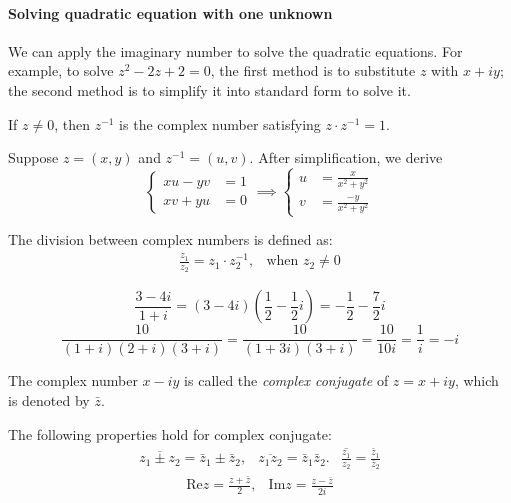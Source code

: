 \paragraph{Solving quadratic equation with one unknown}We can apply the imaginary number to solve the quadratic equations. For example, to solve $z^2-2z+2=0$, the first method is to substitute $z$ with $x+iy$; the second method is to simplify it into standard form to solve it.
\begin{definition} 
If $z\ne0$, then $z^{-1}$ is the complex number satisfying $z\cdot z^{-1}=1$.
\end{definition}
Suppose $z=(x,y)$ and $z^{-1}=(u,v)$. After simplification, we derive
\[
\left\{
\begin{aligned}
xu - yv &=1\\
xv + yu &=0
\end{aligned}
\right.\implies
\left\{
\begin{aligned}
u&=\frac{x}{x^2+y^2}\\
v&=\frac{-y}{x^2+y^2}
\end{aligned}
\right.
\]
\begin{definition}[Division]
The division between complex numbers is defined as:
\[
\begin{array}{ll}
\frac{z_1}{z_2}=z_1\cdot z_2^{-1},
&
\mbox{when }z_2\ne0
\end{array}
\]
\end{definition}
\begin{example}
\[
\frac{3-4i}{1+i} = (3-4i)\left(\frac{1}{2} - \frac{1}{2}i\right)
=-\frac{1}{2} - \frac{7}{2}i
\]
\[
\frac{10}{(1+i)(2+i)(3+i)}=\frac{10}{(1+3i)(3+i)}=\frac{10}{10i}=\frac{1}{i}=-i
\]
\end{example}
\begin{definition}
The complex number $x-iy$ is called the \emph{complex conjugate} of $z = x+iy$, which is denoted by $\bar z$.
\end{definition}
The following properties hold for complex conjugate:
\[
\begin{array}{lll}
\overline{z_1\pm z_2} = \bar z_1\pm\bar z_2,
&
\overline{z_1z_2} = \bar z_1\bar z_2.
&
\overline{\frac{z_1}{z_2}}=\frac{\bar z_1}{\bar z_2}
\end{array}
\]
\[
\begin{array}{ll}
\mbox{Re}z=\frac{z+\bar z}{2},
&
\mbox{Im}z = \frac{z - \bar z}{2i}
\end{array}
\]

